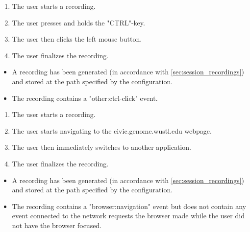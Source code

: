 \begin{tests}
    {\begin{enumerate}
        \item The \gls{user} starts a recording.
        \item The \gls{user} presses and holds the "CTRL"-key.
        \item The \gls{user} then clicks the left mouse button.
        \item The \gls{user} finalizes the recording.
    \end{enumerate}}
    {\begin{itemize}
        \item A recording has been generated (in accordance with \ref{sec:session_recordings}) and stored at the path specified by the configuration.
        \item The recording contains a "other:ctrl-click" event.
    \end{itemize}}

    {\begin{enumerate}
        \item The \gls{user} starts a recording.
        \item The \gls{user} starts navigating to the civic.genome.wustl.edu webpage.
        \item The \gls{user} then immediately switches to another application.
        \item The \gls{user} finalizes the recording.
    \end{enumerate}}
    {\begin{itemize}
        \item A recording has been generated (in accordance with \ref{sec:session_recordings}) and stored at the path specified by the configuration.
        \item The recording contains a "browser:navigation" \gls{event} but does not contain any \gls{event} connected to the network requests the \gls{browser} made while the \gls{user} did not have the \gls{browser} focused.
    \end{itemize}}
\end{tests}

